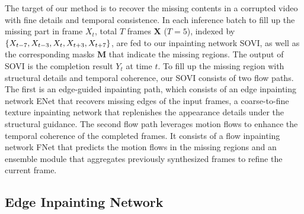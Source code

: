 The target of our method is to recover the missing contents in a corrupted video with fine details and temporal consistence.
%
In each inference batch to fill up the missing part in frame $X_t$, total $T$ frames $\boldsymbol{X}$ ($T=5$), indexed by $\{X_{t-7},X_{t-3},X_{t},X_{t+3},X_{t+7}\}$, are fed to our inpainting network SOVI, as well as the corresponding masks $\boldsymbol{M}$ that indicate the missing regions.
The output of SOVI is the completion result \(Y_t\) at time $t$. 
%
To fill up the missing region with structural details and temporal coherence, our SOVI consists of two flow paths. The first is an edge-guided inpainting path, which consists of an edge inpainting network ENet that recovers missing edges of the input frames, a coarse-to-fine texture inpainting network that replenishes the appearance details under the structural guidance.
The second flow path leverages motion flows to enhance the temporal coherence of the completed frames.
It consists of a flow inpainting network FNet that predicts the motion flows in the missing regions and an ensemble module that aggregates previously synthesized frames to refine the current frame.%
 



\subsection{Edge Inpainting Network}
\label{sec:edgenet}

